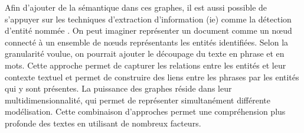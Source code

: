 Afin d'ajouter de la sémantique dans ces graphes, il est aussi possible de s'appuyer sur les techniques d'extraction d'information (\acrshort{ie}) comme la détection d'entité nommée \cite{patel-schneiderUsingDescriptionLogics2015}.
On peut imaginer représenter un document comme un nœud connecté à un ensemble de nœuds représentants les entités identifiées.
Selon la granularité voulue, on pourrait ajouter le découpage du texte en phrase et en mots.
Cette approche permet de capturer les relations entre les entités et leur contexte textuel et permet de construire des liens entre les phrases par les entités qui y sont présentes.
La puissance des graphes réside dans leur multidimensionnalité, qui permet de représenter simultanément différente modélisation.
Cette combinaison d'approches permet une compréhension plus profonde des textes en utilisant de nombreux facteurs.

